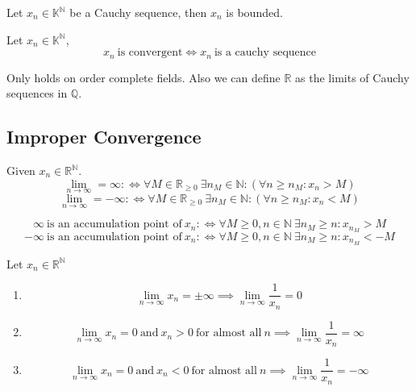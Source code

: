 \begin{theorem}\label{thm:cauchy_bound}
   Let \(x_n \in \mathbb{K}^\mathbb{N}\) be a Cauchy sequence, then \(x_n\) is bounded.
\end{theorem}

\begin{theorem}\label{thm:cauchy_crit_seq}
   Let \(x_n \in \mathbb{K}^\mathbb{N}\),
   \[x_n~\text{is convergent} \iff x_n~\text{is a cauchy sequence}\]
\end{theorem}
\begin{remark}
   Only holds on order complete fields.
   Also we can define \(\mathbb{R}\) as the limits of Cauchy sequences in \(\mathbb{Q}\).
\end{remark}

\subsection{Improper Convergence}
\begin{definition}
   Given \(x_n \in \mathbb{R}^\mathbb{N}\).
   \[\lim_{n \to \infty} = \infty :\iff \forall M \in \mathbb{R}_{\geq 0}~\exists n_M \in \mathbb{N}: (\forall n \geq n_M: x_n > M)\]
   \[\lim_{n \to \infty} = -\infty :\iff \forall M \in \mathbb{R}_{\geq 0}~\exists n_M \in \mathbb{N}: (\forall n \geq n_M: x_n < M)\]
\end{definition}
\begin{remark}
   \[\infty~\text{is an accumulation point of}~x_n :\iff \forall M \geq 0, n \in \mathbb{N}~\exists n_M \geq n: x_{n_M} > M\]
   \[-\infty~\text{is an accumulation point of}~x_n :\iff \forall M \geq 0, n \in \mathbb{N}~\exists n_M \geq n: x_{n_M} < -M\]
\end{remark}

\begin{theorem}
   Let \(x_n \in \mathbb{R}^\mathbb{N}\)
   \begin{enumerate}[label=\roman*, align=Center]
      \item \[\lim_{n \to \infty} x_n = \pm\infty \implies \lim_{n \to \infty} \frac{1}{x_n} = 0\]
      \item \[\lim_{n \to \infty} x_n = 0~\text{and}~x_n > 0~\text{for almost all}~n \implies \lim_{n \to \infty} \frac{1}{x_n} = \infty\]
      \item \[\lim_{n \to \infty} x_n = 0~\text{and}~x_n < 0~\text{for almost all}~n \implies \lim_{n \to \infty} \frac{1}{x_n} = -\infty\]
   \end{enumerate}
\end{theorem}

